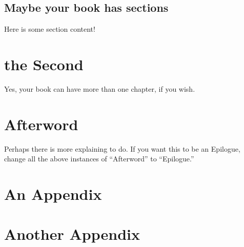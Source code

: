 \documentclass[12pt,twoside]{book}
\begin{document}
   \section{Maybe your book has sections}
         Here is some section content!
 

\chapter{the Second}	
        Yes, your book can have more than one chapter, if you wish. 


\chapter*{Afterword}
	\setcounter{chapter}{4}
	\setcounter{section}{0}
	
Perhaps there is more explaining to do. If you want this to be an Epilogue, change all the above instances of ``Afterword'' to ``Epilogue.'' 

    \appendix
      \chapter{An Appendix}
      \chapter{Another Appendix}
\end{document}
